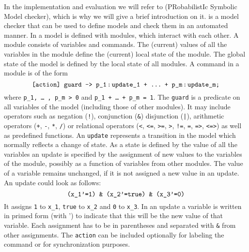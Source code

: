 \documentclass[preview]{standalone}
\begin{document}
In the implementation and evaluation we will refer to \prism (PRobabilistIc Symbolic Model checker), which is why we will give a brief introduction on it. \prism is a model checker that can be used to define models and check them in an automated manner. In \prism a model is defined with modules, which interact with each other. A module consists of variables and commands. The (current) values of all the variables in the module define the (current) local state of the module. The global state of the model is defined by the local state of all modules.
A command in a module is of the form 
\[
\text{\texttt{[action] guard -> p\_1\!\;:\!\;update\_1\space+\space\dots\;\,+\space p\_m\!\;:\!\;update\_m;}} 
\]
where \texttt{p\_1, \dots\;\,, p\_m > 0} and \texttt{p\_1 + \dots\;\,+ p\_m = 1}.
The \texttt{guard} is a predicate on all variables of the model (including those of other modules). It may include operators such as negation (\texttt{!}), conjunction (\texttt{\&}) disjunction (\texttt{|}), arithmetic operators (\texttt{+}, \texttt{-}, \texttt{*}, \texttt{/}) or relational operators (\texttt{<}, \texttt{<=}, \texttt{>=}, \texttt{>}, \texttt{!=}, \texttt{=}, \texttt{=>}, \texttt{<=>}) as well as predefined functions.
An \texttt{update} represents a transition in the model which normally reflects a change of state. As a state is defined by the value of all the variables an update is specified by the assignment of new values to the variables of the module, possibly as a function of variables from other modules. The value of a variable remains unchanged, if it is not assigned a new value in an update. An update could look as follows:
\[
\text{\texttt{(x\_1'=1) \& (x\_2'=true) \& (x\_3'=0)}}
\]
It assigns \texttt{1} to \texttt{x\_1}, \texttt{true} to \texttt{x\_2} and \texttt{0} to \texttt{x\_3}. In an update a variable is written in primed form (with ') to indicate that this will be the new value of that variable. Each assignment has to be in parentheses and separated with \texttt{\&} from other assignments.
The \texttt{action} can be included optionally for labeling the command or for synchronization purposes. 
\end{document}
